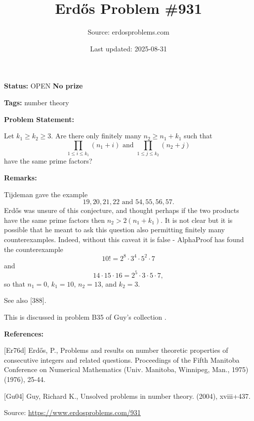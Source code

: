 \documentclass{article}
\title{Erd\H{o}s Problem \#931}
\date{Last updated: 2025-08-31}
\author{Source: erdosproblems.com}
\begin{document}
\maketitle

\noindent\textbf{Status:} OPEN \quad \textbf{No prize}

\noindent\textbf{Tags:} number theory

\medskip
\noindent\textbf{Problem Statement:}

Let $k_1\geq k_2\geq 3$. Are there only finitely many $n_2\geq n_1+k_1$ such that\[\prod_{1\leq i\leq k_1}(n_1+i)\textrm{ and }\prod_{1\leq j\leq k_2}(n_2+j)\]have the same prime factors?

\bigskip
\noindent\textbf{Remarks:}

Tijdeman gave the example\[19,20,21,22\textrm{ and }54,55,56,57.\]Erd\H{o}s \cite{Er76d} was unsure of this conjecture, and thought perhaps if the two products have the same prime factors then $n_2>2(n_1+k_1)$. It is not clear but it is possible that he meant to ask this question also permitting finitely many counterexamples. Indeed, without this caveat it is false - AlphaProof has found the counterexample\[10! = 2^8\cdot 3^4\cdot 5^2\cdot 7\]and\[14\cdot 15\cdot 16 = 2^5\cdot 3\cdot 5\cdot 7,\]so that $n_1=0$, $k_1=10$, $n_2=13$, and $k_2=3$.

See also [388].

This is discussed in problem B35 of Guy's collection \cite{Gu04}.

\bigskip
\noindent\textbf{References:}

[Er76d] Erd\H{o}s, P., Problems and results on number theoretic properties of consecutive integers and related questions. Proceedings of the Fifth Manitoba Conference on Numerical Mathematics (Univ. Manitoba, Winnipeg, Man., 1975) (1976), 25-44.
 
 [Gu04] Guy, Richard K., Unsolved problems in number theory. (2004), xviii+437.

\bigskip
\noindent\small{Source: \url{https://www.erdosproblems.com/931}}
\end{document}
